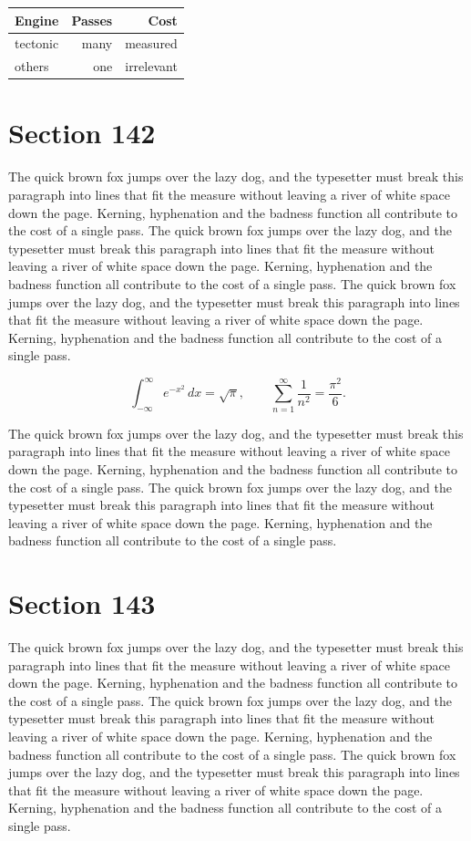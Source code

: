 \documentclass{article}
\begin{document}
\begin{center}
\begin{tabular}{lrr}
\toprule
Engine & Passes & Cost \\
\midrule
tectonic & many & measured \\
others & one & irrelevant \\
\bottomrule
\end{tabular}
\end{center}

\section{Section 142}
The quick brown fox jumps over the lazy dog, and the typesetter must break this paragraph into lines that fit the measure without leaving a river of white space down the page. Kerning, hyphenation and the badness function all contribute to the cost of a single pass. The quick brown fox jumps over the lazy dog, and the typesetter must break this paragraph into lines that fit the measure without leaving a river of white space down the page. Kerning, hyphenation and the badness function all contribute to the cost of a single pass. The quick brown fox jumps over the lazy dog, and the typesetter must break this paragraph into lines that fit the measure without leaving a river of white space down the page. Kerning, hyphenation and the badness function all contribute to the cost of a single pass. 

\begin{equation}
\int_{-\infty}^{\infty} e^{-x^{2}}\,dx = \sqrt{\pi}, \qquad
\sum_{n=1}^{\infty} \frac{1}{n^{2}} = \frac{\pi^{2}}{6}.
\end{equation}

The quick brown fox jumps over the lazy dog, and the typesetter must break this paragraph into lines that fit the measure without leaving a river of white space down the page. Kerning, hyphenation and the badness function all contribute to the cost of a single pass. The quick brown fox jumps over the lazy dog, and the typesetter must break this paragraph into lines that fit the measure without leaving a river of white space down the page. Kerning, hyphenation and the badness function all contribute to the cost of a single pass. 
\section{Section 143}
The quick brown fox jumps over the lazy dog, and the typesetter must break this paragraph into lines that fit the measure without leaving a river of white space down the page. Kerning, hyphenation and the badness function all contribute to the cost of a single pass. The quick brown fox jumps over the lazy dog, and the typesetter must break this paragraph into lines that fit the measure without leaving a river of white space down the page. Kerning, hyphenation and the badness function all contribute to the cost of a single pass. The quick brown fox jumps over the lazy dog, and the typesetter must break this paragraph into lines that fit the measure without leaving a river of white space down the page. Kerning, hyphenation and the badness function all contribute to the cost of a single pass. 
\end{document}
